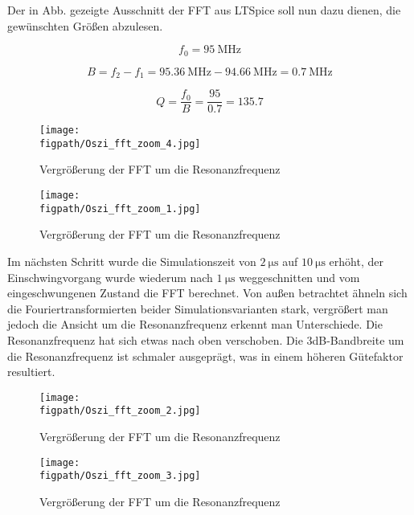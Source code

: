 Der in Abb. gezeigte Ausschnitt der FFT aus LTSpice soll nun dazu dienen, die gewünschten Größen abzulesen.

\begin{equation*}
    f_0 = \SI{95}{\mega\hertz}
\end{equation*}

\begin{equation*}
    B = f_2 - f_1 = \SI{95.36}{\mega\hertz} - \SI{94.66}{\mega\hertz} = \SI{0.7}{\mega\hertz}
\end{equation*}

\begin{equation*}
    Q = \frac{f_0}{B} = \frac{95}{0.7} = 135.7
\end{equation*}

\begin{figure}[H]
    \centering
    \texttt{[image: \\figpath/Oszi\_fft\_zoom\_4.jpg]}
    \caption{Vergrößerung der FFT um die Resonanzfrequenz}
    \label{fig_Kap2_05:LTSpiceSchematic}
\end{figure}

\begin{figure}[H]
    \centering
    \texttt{[image: \\figpath/Oszi\_fft\_zoom\_1.jpg]}
    \caption{Vergrößerung der FFT um die Resonanzfrequenz}
    \label{fig_Kap2_05:LTSpiceSchematic}
\end{figure}

Im nächsten Schritt wurde die Simulationszeit von $\SI{2}{\micro\second}$ auf $\SI{10}{\micro\second}$ erhöht, der Einschwingvorgang wurde wiederum nach $\SI{1}{\micro\second}$ weggeschnitten und vom eingeschwungenen Zustand die FFT berechnet. Von außen betrachtet ähneln sich die Fouriertransformierten beider Simulationsvarianten stark, vergrößert man jedoch die Ansicht um die Resonanzfrequenz erkennt man Unterschiede. Die Resonanzfrequenz hat sich etwas nach oben verschoben. Die 3dB-Bandbreite um die Resonanzfrequenz ist schmaler ausgeprägt, was in einem höheren Gütefaktor resultiert.

\begin{figure}[H]
    \centering
    \texttt{[image: \\figpath/Oszi\_fft\_zoom\_2.jpg]}
    \caption{Vergrößerung der FFT um die Resonanzfrequenz}
    \label{fig_Kap2_05:LTSpiceSchematic}
\end{figure}

\begin{figure}[H]
    \centering
    \texttt{[image: \\figpath/Oszi\_fft\_zoom\_3.jpg]}
    \caption{Vergrößerung der FFT um die Resonanzfrequenz}
    \label{fig_Kap2_05:LTSpiceSchematic}
\end{figure}


